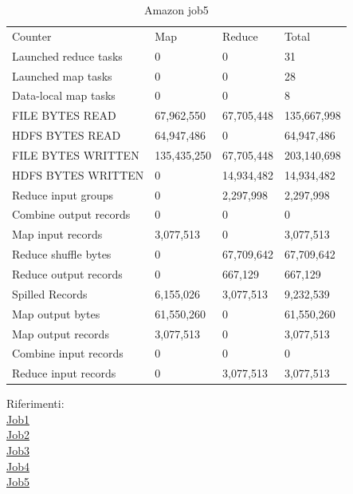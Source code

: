 \documentclass[paper=a4, fontsize=11pt]{scrartcl}	%
\numberwithin{equation}{section}															%
\numberwithin{figure}{section}																%
\numberwithin{table}{section}																%
\begin{document}
\begin{table}[]
	\centering
	\caption{Amazon job5}
	\label{my-label}
	\begin{tabular}{llll}
		Counter&	Map&	Reduce&	Total\\
		Launched reduce tasks&	0&	0&	31\\
		Launched map tasks&	0&	0&	28\\
		Data-local map tasks&	0&	0&	8\\
		FILE BYTES READ&	67,962,550&	67,705,448&	135,667,998\\
		HDFS BYTES READ&	64,947,486&	0&	64,947,486\\
		FILE BYTES WRITTEN&	135,435,250&	67,705,448&	203,140,698\\
		HDFS BYTES WRITTEN&	0&	14,934,482&	14,934,482\\
		Reduce input groups&	0&	2,297,998&	2,297,998\\
		Combine output records&	0&	0&	0\\
		Map input records&	3,077,513&	0&	3,077,513\\
		Reduce shuffle bytes&	0&	67,709,642&	67,709,642\\
		Reduce output records&	0&	667,129&	667,129\\
		Spilled Records&	6,155,026&	3,077,513&	9,232,539\\
		Map output bytes&	61,550,260&	0&	61,550,260\\
		Map output records&	3,077,513&	0&	3,077,513\\
		Combine input records&	0&	0&	0\\
		Reduce input records&	0&	3,077,513&	3,077,513\\
	\end{tabular}
\end{table}
Riferimenti:\\	
\href{http://hadoop-compute0.di.univr.it:50030/jobdetails.jsp?jobid=job_201603141010_12271}{Job1}\\
\href{http://hadoop-compute0.di.univr.it:50030/jobdetails.jsp?jobid=job_201603141010_12272}{Job2}\\
\href{http://hadoop-compute0.di.univr.it:50030/jobdetails.jsp?jobid=job_201603141010_12273}{Job3}\\
\href{http://hadoop-compute0.di.univr.it:50030/jobdetails.jsp?jobid=job_201603141010_12274}{Job4}\\
\href{http://hadoop-compute0.di.univr.it:50030/jobdetails.jsp?jobid=job_201603141010_12275}{Job5}\\
\end{document}
